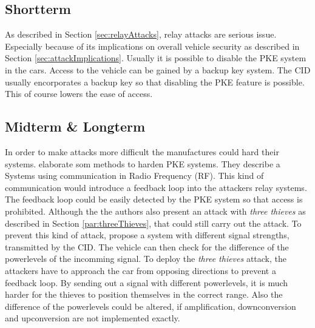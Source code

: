 
\subsection{Shortterm}
	As described in Section \ref{sec:relayAttacks}, relay attacks are serious issue.
	Especially because of its implications on overall vehicle security as described in Section \ref{sec:attackImplications}.
	Usually it is possible to disable the PKE system in the cars.
	Access to the vehicle can be gained by a backup key system.
	The CID usually encorporates a backup key so that disabling the PKE feature is possible.
	This of course lowers the ease of access.

\subsection{Midterm \& Longterm}
	In order to make attacks more difficult the manufactures could hard their systems.
	\citeauthor{someAttacksPKES} elaborate som methods to harden PKE systems.
	They describe a Systems using communication in Radio Frequency (RF).
	This kind of communication would introduce a feedback loop into the attackers relay systems.
	The feedback loop could be easily detected by the PKE system so that access is prohibited.
	Although the the authors also present an attack with \textsl{three thieves}
	as described in Section \ref{par:threeThieves}, that could still
	carry out the attack.
	To prevent this kind of attack,
	\citeauthor{someAttacksPKES} propose a system with different signal strengths,
	transmitted by the CID.
	The vehicle can then check for the difference of the powerlevels of the incomming signal.
	To deploy the \textsl{three thieves} attack,
	the attackers have to approach the car from opposing directions to prevent a feedback loop.
	By sending out a signal with different powerlevels,
	it is much harder for the thieves to position themselves in the correct range.
	Also the difference of the powerlevels could be altered,
	if amplification, downconversion and upconversion are not implemented exactly.

